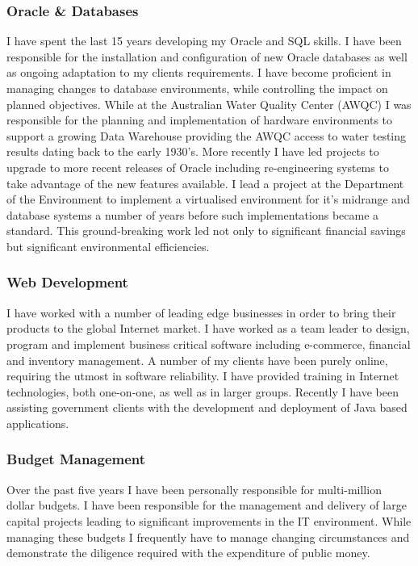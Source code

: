 \documentclass[]{friggeri-cv} %
\begin{document}
\subsubsection*{Oracle \& Databases}
I have spent the last 15 years developing my Oracle and SQL skills. I have been responsible for the installation and configuration of new Oracle databases as well as ongoing adaptation to my clients requirements. I have become proficient in managing changes to database environments, while controlling the impact on planned objectives. While at the Australian Water Quality Center (AWQC) I was responsible for the planning and implementation of hardware environments to support a growing Data Warehouse providing the AWQC access to water testing results dating back to the early 1930’s. More recently I have led projects to upgrade to more recent releases of Oracle including re-engineering systems to take advantage of the new features available. I lead a project at the Department of the Environment to implement a virtualised environment for it's midrange and database systems a number of years before such implementations became a standard. This ground-breaking work led not only to significant financial savings but significant environmental efficiencies.

\subsubsection*{Web Development}
I have worked with a number of leading edge businesses in order to bring their products to the global Internet market. I have worked as a team leader to design, program and implement business critical software including e-commerce, financial and inventory management. A number of my clients have been purely online, requiring the utmost in software reliability. I have provided training in Internet technologies, both one-on-one, as well as in larger groups. Recently I have been assisting government clients with the development and deployment of Java based applications.

\subsubsection*{Budget Management}
Over the past five years I have been personally responsible for multi-million dollar budgets. I have been responsible for the management and delivery of large capital projects leading to significant improvements in the IT environment. While managing these budgets I frequently have to manage changing circumstances and demonstrate the diligence required with the expenditure of public money.
\end{document}

